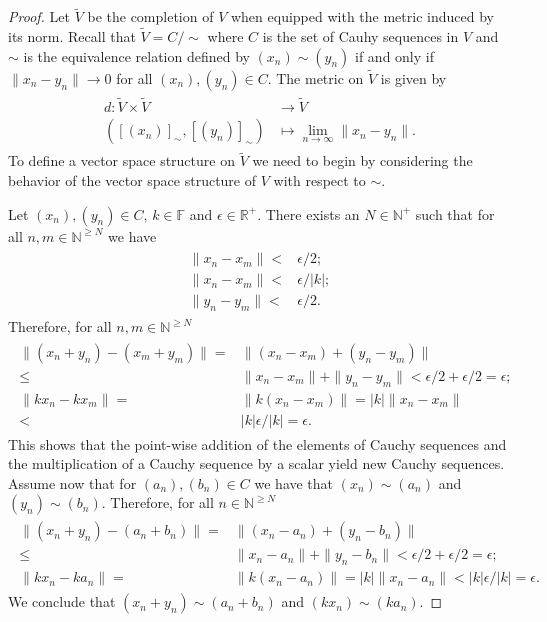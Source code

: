 \begin{proof}
	Let $\tilde{V}$ be the completion of $V$ when equipped with the metric induced by its norm. Recall that $\tilde{V}=C/{\sim}$ where $C$ is the set of Cauhy sequences in $V$ and $\sim$ is the equivalence relation defined by $(x_n)\sim(y_n)$ if and only if $\|x_n-y_n\|\rightarrow 0$ for all $(x_n),(y_n)\in C$. The metric on $\tilde{V}$ is given by
\begin{align}\label{eq:metric_extension}
\begin{split}
d:\tilde{V}\times\tilde{V}&\rightarrow\tilde{V}\\
([(x_n)]_\sim,[(y_n)]_\sim)&\mapsto \lim_{n\rightarrow\infty} \|x_n-y_n\|.
\end{split}
\end{align}
To define a vector space structure on $\tilde{V}$ we need to begin by considering the behavior of the vector space structure of $V$ with respect to $\sim$.

	Let $(x_n),(y_n)\in C$, $k\in\mathbb{F}$ and $\epsilon\in\mathbb{R}^+$. There exists an $N\in\mathbb{N}^+$ such that for all $n,m\in\mathbb{N}^{\geq N}$ we have
	\begin{align}
	\begin{split}
	\|x_n-x_m\|<&\epsilon/2;\\
	\|x_n-x_m\|<&\epsilon/|k|;\\
	\|y_n-y_m\|<&\epsilon/2.
	\end{split}
	\end{align}
Therefore, for all $n,m\in\mathbb{N}^{\geq N}$
	\begin{align}
	\begin{split}
		\|(x_n+y_n)-(x_m+y_m)\|=&\|(x_n-x_m)+(y_n-y_m)\|\\
		\leq&\|x_n-x_m\|+\|y_n-y_m\|<\epsilon/2+\epsilon/2=\epsilon;\\
		\|kx_n-kx_m\|=&\|k(x_n-x_m)\|=|k|\|x_n-x_m\|\\
		<&|k|\epsilon/|k|=\epsilon.
	\end{split}
	\end{align}
This shows that the point-wise addition of the elements of Cauchy sequences and the multiplication of a Cauchy sequence by a scalar yield new Cauchy sequences. Assume now that for $(a_n),(b_n)\in C$ we have that $(x_n)\sim(a_n)$ and $(y_n)\sim(b_n)$.
Therefore, for all $n\in\mathbb{N}^{\geq N}$
	\begin{align}
	\begin{split}
		\|(x_n+y_n)-(a_n+b_n)\|=&\|(x_n-a_n)+(y_n-b_n)\|\\
		\leq&\|x_n-a_n\|+\|y_n-b_n\|<\epsilon/2+\epsilon/2=\epsilon;\\
		\|kx_n-ka_n\|=&\|k(x_n-a_n)\|=|k|\|x_n-a_n\|<|k|\epsilon/|k|=\epsilon.
	\end{split}
	\end{align}
We conclude that $(x_n+y_n)\sim(a_n+b_n)$ and $(kx_n)\sim(ka_n)$. 


\end{proof}
